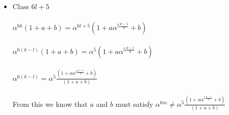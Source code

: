 \documentclass[12pt]{article}
\begin{document}
\begin{itemize}
	\item Class $6l+5$ \\ \\
		$\alpha^{6k}(1+a+b) = \alpha^{6l+5}(1+a\alpha^{5\frac{p-1}{6}}+b)$
		\\ \\
		$\alpha^{6(k-l)}(1+a+b) = \alpha^{5}(1+a\alpha^{5\frac{p-1}{6}}+b)$
		\\ \\
		$\alpha^{6(k-l)} = \alpha^{5}\frac{(1+a\alpha^{5\frac{p-1}{6}}+b)}{(1+a+b)}$
		\\ \\
		From this we know that $a$ and $b$ must satisfy $\alpha^{6m} \neq \alpha^{5}\frac{(1+a\alpha^{5\frac{p-1}{6}}+b)}{(1+a+b)}$
\end{itemize}
\end{document}
